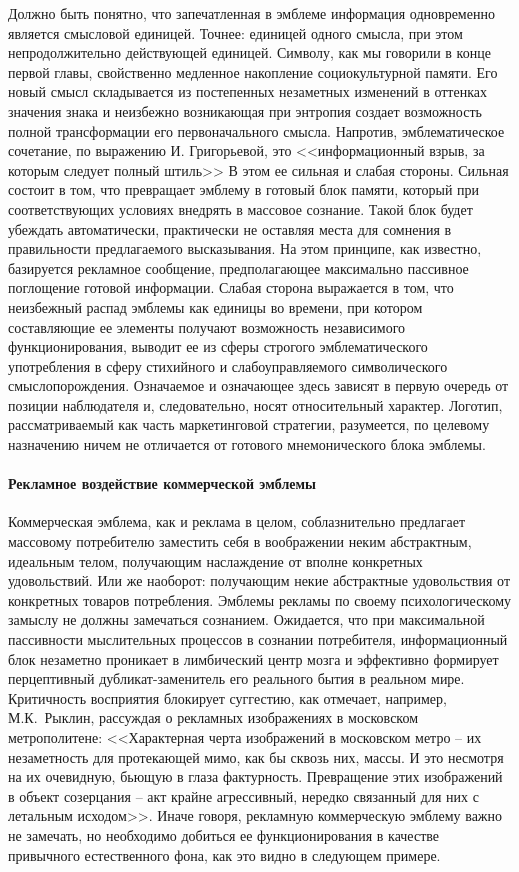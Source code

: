 Должно быть понятно, что запечатленная в эмблеме информация одновременно является смысловой
единицей. Точнее: единицей одного смысла, при этом непродолжительно действующей единицей.  Символу,
как мы говорили в конце первой главы, свойственно медленное накопление социокультурной памяти.  Его
новый смысл складывается из постепенных незаметных изменений в оттенках значения знака и неизбежно
возникающая при энтропия создает возможность полной трансформации его первоначального
смысла. Напротив, эмблематическое сочетание, по выражению И. Григорьевой, это <<информационный взрыв,
за которым следует полный штиль>> \autocite[][50]{grigoreva2005} В этом ее сильная и слабая стороны. Сильная
состоит в том, что превращает эмблему в готовый блок памяти, который при соответствующих условиях
внедрять в массовое сознание. Такой блок будет убеждать автоматически, практически не оставляя места
для сомнения в правильности предлагаемого высказывания. На этом принципе, как известно, базируется
рекламное сообщение, предполагающее максимально пассивное поглощение готовой информации.  Слабая
сторона выражается в том, что неизбежный распад эмблемы как единицы во времени, при котором
составляющие ее элементы получают возможность независимого функционирования, выводит ее из сферы
строгого эмблематического употребления в сферу стихийного и слабоуправляемого символического
смыслопорождения. Означаемое и означающее здесь зависят в первую очередь от позиции наблюдателя и,
следовательно, носят относительный характер. Логотип, рассматриваемый как часть маркетинговой
стратегии, разумеется, по целевому назначению ничем не отличается от готового мнемонического блока
эмблемы.

\paragraph{Рекламное воздействие коммерческой эмблемы}

Коммерческая эмблема, как и реклама в целом, соблазнительно предлагает массовому
потребителю заместить себя в воображении неким абстрактным, идеальным телом,
получающим наслаждение от вполне конкретных удовольствий. Или же наоборот:
получающим некие абстрактные удовольствия от конкретных товаров потребления.
Эмблемы рекламы по своему психологическому замыслу не должны замечаться сознанием.
Ожидается, что при максимальной пассивности мыслительных процессов в сознании
потребителя, информационный блок незаметно проникает в лимбический центр  мозга
и эффективно формирует перцептивный дубликат-заменитель его реального бытия в
реальном мире. Критичность восприятия блокирует суггестию, как отмечает, например,
М.К.~Рыклин, рассуждая о рекламных изображениях в московском метрополитене:
<<Характерная черта изображений в московском метро -- их незаметность для
протекающей мимо, как бы сквозь них, массы. И это несмотря на их очевидную,
бьющую в глаза фактурность. Превращение этих изображений в объект созерцания --
акт крайне агрессивный, нередко связанный для них с летальным
исходом>>\autocite[][41]{ryklin1992}.
Иначе говоря, рекламную коммерческую эмблему важно не замечать, но необходимо
добиться ее функционирования в качестве привычного естественного фона, как это
видно в следующем примере.

